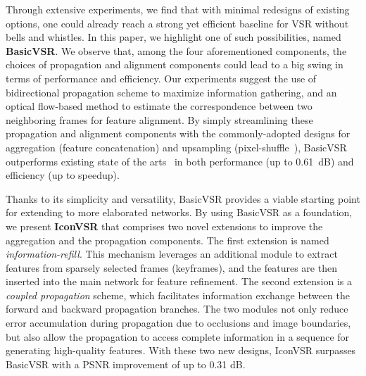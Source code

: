 \documentclass[final]{cvpr}
\begin{document}
Through extensive experiments, we find that with minimal redesigns of existing options, one could already reach a strong yet efficient baseline for VSR without bells and whistles.
In this paper, we highlight one of such possibilities, named \textbf{\mbox{BasicVSR}}.
We observe that, among the four aforementioned components, the choices of propagation and alignment components could lead to a big swing in terms of performance and efficiency.
Our experiments suggest the use of bidirectional propagation scheme to maximize information gathering, and an optical flow-based method to estimate the correspondence between two neighboring frames for feature alignment.
By simply streamlining these propagation and alignment components with the commonly-adopted designs for aggregation (\ie feature concatenation) and upsampling (\ie pixel-shuffle~\cite{shi2016real}), \mbox{BasicVSR} outperforms existing state of the arts~\cite{haris2019recurrent,isobe2020video1,wang2019edvr} in both performance (up to 0.61~dB) and efficiency (up to  speedup).

Thanks to its simplicity and versatility, \mbox{BasicVSR} provides a viable starting point for extending to more elaborated networks.
By using \mbox{BasicVSR} as a foundation, we present \textbf{\mbox{IconVSR}} that comprises two novel extensions to improve the aggregation and the propagation components.
The first extension is named \textit{information-refill}. This mechanism leverages an additional module to extract features from sparsely selected frames (keyframes), and the features are then inserted into the main network for feature refinement.
The second extension is a \textit{coupled propagation} scheme, which facilitates information exchange between the forward and backward propagation branches.
The two modules not only reduce error accumulation during propagation due to occlusions and image boundaries, but also allow the propagation to access complete information in a sequence for generating high-quality features.
With these two new designs, \mbox{IconVSR} surpasses \mbox{BasicVSR} with a PSNR improvement of up to 0.31 dB.
\end{document}
